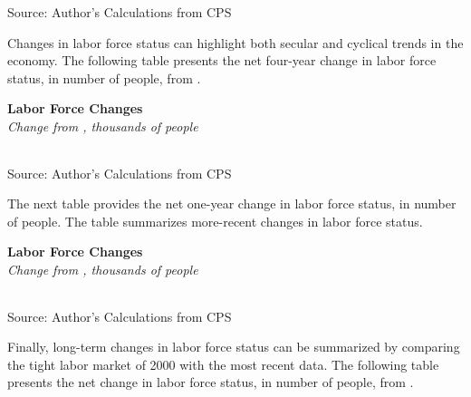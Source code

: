 \documentclass{report}
\begin{document}
{\begin{minipage}{0.76\textwidth}
\footnotesize{Source: Author's Calculations from CPS}
\vspace{4mm}

\small Changes in labor force status can highlight both secular and cyclical trends in the economy. The following table presents the net four-year change in labor force status, in number of people, from \unskip.
\vspace{1mm}

\normalsize \textbf{Labor Force Changes}\\
\footnotesize{\textit{Change from \unskip, thousands of people}}\\
\noindent {} \setlength{\tabcolsep}{3.0pt} \color{black!90}
		{\renewcommand{\arraystretch}{1.5}
\hspace*{-1mm} \begin{tabular}{p{28.5mm} R{11.2mm} R{10.4mm} R{10.4mm} R{10.2mm} 
		 				 R{10.6mm} R{10.4mm} R{10.4mm}}
			  \hline
		\end{tabular}}
		\vspace{-3mm}
		
\footnotesize{Source: Author's Calculations from CPS}
\end{minipage}
\newpage
\begin{minipage}{0.76\textwidth} \small The next table provides the net one-year change in labor force status, in number of people. The table summarizes more-recent changes in labor force status. 
\vspace{1mm}

\normalsize \textbf{Labor Force Changes}\\
\footnotesize{\textit{Change from \unskip, thousands of people}}\\
\noindent {} \setlength{\tabcolsep}{3.0pt} \color{black!90}
		{\renewcommand{\arraystretch}{1.5}
\hspace*{-1mm} \begin{tabular}{p{28.5mm} R{11.2mm} R{10.4mm} R{10.4mm} R{10.2mm} 
		 				 R{10.6mm} R{10.4mm} R{10.4mm}}
			  \hline
		\end{tabular}}
		\vspace{-3mm}
		
\footnotesize{Source: Author's Calculations from CPS}
\vspace{4mm}

\small Finally, long-term changes in labor force status can be summarized by comparing the tight labor market of 2000 with the most recent data. The following table presents the net change in labor force status, in number of people, from \unskip.
\vspace{1mm}


\end{minipage}}
\end{document}

